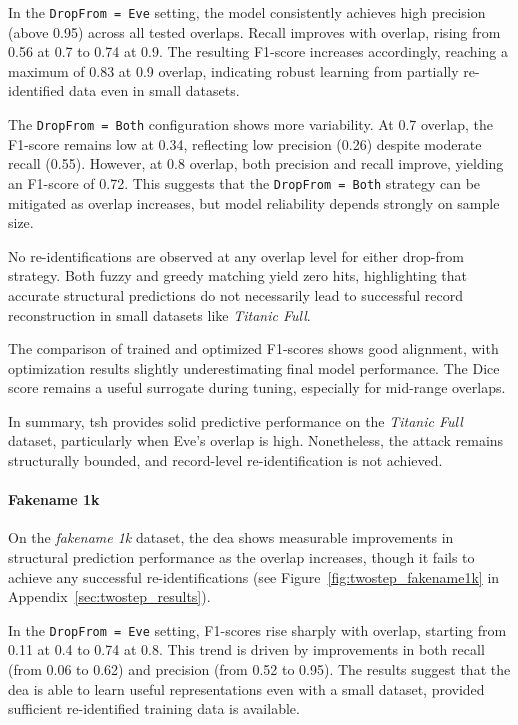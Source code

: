 In the \texttt{DropFrom = Eve} setting, the model consistently achieves high precision (above 0.95) across all tested overlaps.
Recall improves with overlap, rising from 0.56 at 0.7 to 0.74 at 0.9.
The resulting F1-score increases accordingly, reaching a maximum of 0.83 at 0.9 overlap, indicating robust learning from partially re-identified data even in small datasets.

The \texttt{DropFrom = Both} configuration shows more variability.
At 0.7 overlap, the F1-score remains low at 0.34, reflecting low precision (0.26) despite moderate recall (0.55).
However, at 0.8 overlap, both precision and recall improve, yielding an F1-score of 0.72.
This suggests that the \texttt{DropFrom = Both} strategy can be mitigated as overlap increases, but model reliability depends strongly on sample size.

No re-identifications are observed at any overlap level for either drop-from strategy.
Both fuzzy and greedy matching yield zero hits, highlighting that accurate structural predictions do not necessarily lead to successful record reconstruction in small datasets like \textit{Titanic Full}.

The comparison of trained and optimized F1-scores shows good alignment, with optimization results slightly underestimating final model performance.
The Dice score remains a useful surrogate during tuning, especially for mid-range overlaps.

In summary, \ac{tsh} provides solid predictive performance on the \textit{Titanic Full} dataset, particularly when Eve's overlap is high.
Nonetheless, the attack remains structurally bounded, and record-level re-identification is not achieved.


\paragraph{Fakename 1k}

On the \textit{fakename 1k} dataset, the \ac{dea} shows measurable improvements in structural prediction performance as the overlap increases, though it fails to achieve any successful re-identifications (see Figure~\ref{fig:twostep_fakename1k} in Appendix~\ref{sec:twostep_results}).

In the \texttt{DropFrom = Eve} setting, F1-scores rise sharply with overlap, starting from 0.11 at 0.4 to 0.74 at 0.8.
This trend is driven by improvements in both recall (from 0.06 to 0.62) and precision (from 0.52 to 0.95).
The results suggest that the \ac{dea} is able to learn useful representations even with a small dataset, provided sufficient re-identified training data is available.

